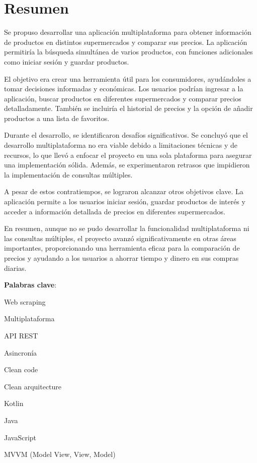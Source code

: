 \documentclass[12pt,twoside,titlepage]{report}
\newcommand\blankpage{%
    \newpage
    \null
    \thispagestyle{empty}%
    \newpage}
\begin{document}
\afterpage{\blankpage}








\chapter*{Resumen}

Se propuso desarrollar una aplicación multiplataforma para obtener información de productos en distintos supermercados y comparar sus precios. La aplicación permitiría la búsqueda simultánea de varios productos, con funciones adicionales como iniciar sesión y guardar productos.

El objetivo era crear una herramienta útil para los consumidores, ayudándoles a tomar decisiones informadas y económicas. Los usuarios podrían ingresar a la aplicación, buscar productos en diferentes supermercados y comparar precios detalladamente. También se incluiría el historial de precios y la opción de añadir productos a una lista de favoritos.

Durante el desarrollo, se identificaron desafíos significativos. Se concluyó que el desarrollo multiplataforma no era viable debido a limitaciones técnicas y de recursos, lo que llevó a enfocar el proyecto en una sola plataforma para asegurar una implementación sólida. Además, se experimentaron retrasos que impidieron la implementación de consultas múltiples.

A pesar de estos contratiempos, se lograron alcanzar otros objetivos clave. La aplicación permite a los usuarios iniciar sesión, guardar productos de interés y acceder a información detallada de precios en diferentes supermercados.

En resumen, aunque no se pudo desarrollar la funcionalidad multiplataforma ni las consultas múltiples, el proyecto avanzó significativamente en otras áreas importantes, proporcionando una herramienta eficaz para la comparación de precios y ayudando a los usuarios a ahorrar tiempo y dinero en sus compras diarias.

\mbox{} \smallskip

\noindent \textbf{Palabras clave}:
\begin{compactitem}
	\item Web scraping
	\item Multiplataforma
	\item API REST
    \item Asincronía
    \item Clean code
    \item Clean arquitecture
    \item Kotlin
    \item Java
    \item JavaScript
    \item MVVM (Model View, View, Model)
\end{compactitem}
\end{document}
